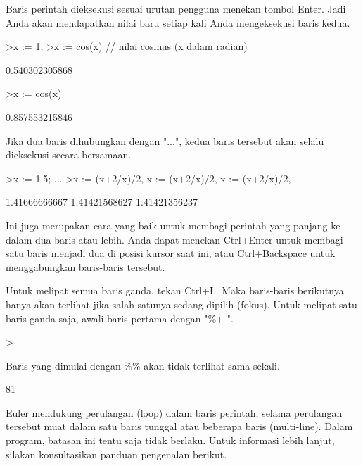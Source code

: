 \documentclass{article}
\newenvironment{eulernotebook}{\par}{\par}
\newenvironment{eulercomment}{\par\medskip}{\par\medskip}
\begin{document}
\begin{eulernotebook}
\begin{eulercomment}
Baris perintah dieksekusi sesuai urutan pengguna menekan tombol Enter.
Jadi Anda akan mendapatkan nilai baru setiap kali Anda mengeksekusi
baris kedua.
\end{eulercomment}
\begin{eulerprompt}
>x := 1;
>x := cos(x) // nilai cosinus (x dalam radian)
\end{eulerprompt}
\begin{euleroutput}
  0.540302305868
\end{euleroutput}
\begin{eulerprompt}
>x := cos(x)
\end{eulerprompt}
\begin{euleroutput}
  0.857553215846
\end{euleroutput}
\begin{eulercomment}
Jika dua baris dihubungkan dengan "...", kedua baris tersebut akan
selalu dieksekusi secara bersamaan.
\end{eulercomment}
\begin{eulerprompt}
>x := 1.5; ...
>x := (x+2/x)/2, x := (x+2/x)/2, x := (x+2/x)/2, 
\end{eulerprompt}
\begin{euleroutput}
  1.41666666667
  1.41421568627
  1.41421356237
\end{euleroutput}
\begin{eulercomment}
Ini juga merupakan cara yang baik untuk membagi perintah yang panjang
ke dalam dua baris atau lebih. Anda dapat menekan Ctrl+Enter untuk
membagi satu baris menjadi dua di posisi kursor saat ini, atau
Ctrl+Backspace untuk menggabungkan baris-baris tersebut.

Untuk melipat semua baris ganda, tekan Ctrl+L. Maka baris-baris
berikutnya hanya akan terlihat jika salah satunya sedang dipilih
(fokus). Untuk melipat satu baris ganda saja, awali baris pertama
dengan "\%+ ".
\end{eulercomment}
\begin{eulerprompt}
>%
\end{eulerprompt}
\begin{eulercomment}
Baris yang dimulai dengan \%\% akan tidak terlihat sama sekali.
\end{eulercomment}
\begin{euleroutput}
  81
\end{euleroutput}
\begin{eulercomment}
Euler mendukung perulangan (loop) dalam baris perintah, selama
perulangan tersebut muat dalam satu baris tunggal atau beberapa baris
(multi-line). Dalam program, batasan ini tentu saja tidak berlaku.
Untuk informasi lebih lanjut, silakan konsultasikan panduan pengenalan
berikut.


\end{eulercomment}
\end{eulernotebook}
\end{document}
